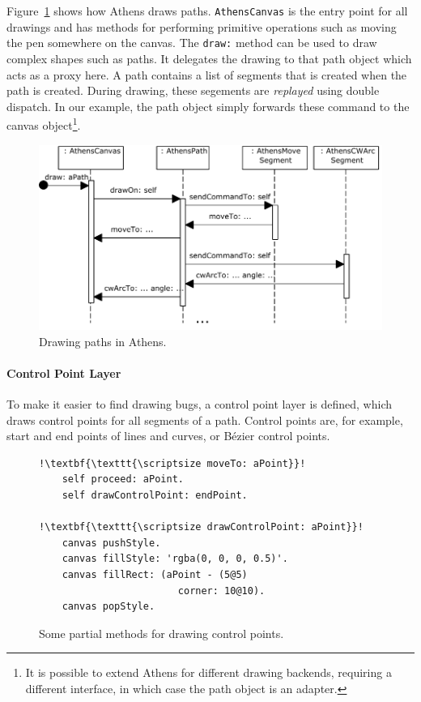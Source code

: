 \documentclass{sig-alternate}
\begin{document}
Figure~\ref{fig:athens_sequence} shows how Athens draws paths. \texttt{AthensCanvas} is the entry point for all drawings and has methods for performing primitive operations such as moving the pen somewhere on the canvas. The \texttt{draw:} method can be used to draw complex shapes such as paths. It delegates the drawing to that path object which acts as a proxy here. A path contains a list of segments that is created when the path is created. During drawing, these segements are \emph{replayed} using double dispatch. In our example, the path object simply forwards these command to the canvas object\footnote{It is possible to extend Athens for different drawing backends, requiring a different interface, in which case the path object is an adapter.}.
\begin{figure}[!htp]
    \includegraphics[width=\columnwidth]{athens_sequence.pdf}
    \caption{Drawing paths in Athens.}
    \label{fig:athens_sequence}
\end{figure}

\paragraph{Control Point Layer}
To make it easier to find drawing bugs, a control point layer is defined, which draws control points for all segments of a path. Control points are, for example, start and end points of lines and curves, or Bézier control points.

\begin{figure}[!htp]
\begin{lstlisting}[escapechar=!]
!\textbf{\texttt{\scriptsize moveTo: aPoint}}!
    self proceed: aPoint.
    self drawControlPoint: endPoint.

!\textbf{\texttt{\scriptsize drawControlPoint: aPoint}}!
    canvas pushStyle.
    canvas fillStyle: 'rgba(0, 0, 0, 0.5)'.
    canvas fillRect: (aPoint - (5@5) 
                        corner: 10@10).
    canvas popStyle.
\end{lstlisting}
\caption{Some partial methods for drawing control points.}
\label{fig:athens_partial}
\end{figure}
\end{document}
